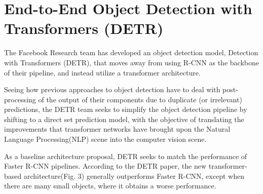 
\section{End-to-End Object Detection with Transformers (DETR)}

The Facebook Research team has developed an object detection model, Detection with Transformers (DETR)\cite{carion_massa_synnaeve_usunier_kirillov_zagoruyko_2020}, that moves away from using R-CNN as the backbone of their pipeline, and instead utilize a transformer architecture. 

Seeing how previous approaches to object detection have to deal with post-processing of the output of their components due to duplicate (or irrelevant) predictions, the DETR team seeks to simplify the object detection pipeline by shifting to a direct set prediction model, with the objective of translating the improvements that transformer networks have brought upon the Natural Language Processing(NLP) scene into the computer vision scene. 


As a baseline architecture proposal, DETR seeks to match the performance of Faster R-CNN pipelines. According to the DETR paper, the new transformer-based architecture(Fig. 3) generally outperforms Faster R-CNN, except when there are many small objects, where it obtains a worse performance.